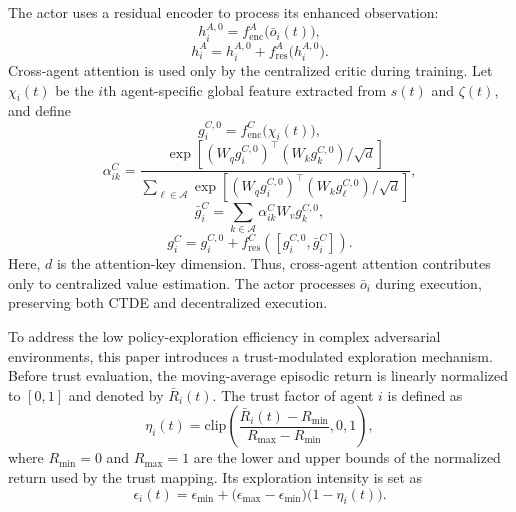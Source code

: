 \documentclass{cja}
\begin{document}
The actor uses a residual encoder to process its enhanced observation:
\begin{equation}
h_i^{A,0}=f_{\mathrm{enc}}^{A}\bigl(\bar o_i(t)\bigr),
\end{equation}
\begin{equation}
h_i^{A}
=
h_i^{A,0}+f_{\mathrm{res}}^{A}\bigl(h_i^{A,0}\bigr).
\end{equation}
Cross-agent attention is used only by the centralized critic during training. Let $\chi_i(t)$ be the $i$th agent-specific global feature extracted from $s(t)$ and $\zeta(t)$, and define
\begin{equation}
g_i^{C,0}=f_{\mathrm{enc}}^{C}\bigl(\chi_i(t)\bigr),
\end{equation}
\begin{equation}
\alpha_{ik}^{C}
=
\frac{
\exp\left[(W_qg_i^{C,0})^{\top}(W_kg_k^{C,0})/\sqrt d\right]
}{
\sum_{\ell\in\mathcal A}
\exp\left[(W_qg_i^{C,0})^{\top}(W_kg_\ell^{C,0})/\sqrt d\right]
},
\end{equation}
\begin{equation}
\bar g_i^{C}
=
\sum_{k\in\mathcal A}\alpha_{ik}^{C}W_vg_k^{C,0},
\end{equation}
\begin{equation}
g_i^{C}
=
g_i^{C,0}
+f_{\mathrm{res}}^{C}\!\left([g_i^{C,0},\bar g_i^{C}]\right).
\end{equation}
Here, $d$ is the attention-key dimension. Thus, cross-agent attention contributes only to centralized value estimation. The actor processes $\bar o_i$ during execution, preserving both CTDE and decentralized execution.

To address the low policy-exploration efficiency in complex adversarial environments, this paper introduces a trust-modulated exploration mechanism. Before trust evaluation, the moving-average episodic return is linearly normalized to $[0,1]$ and denoted by $\bar R_i(t)$. The trust factor of agent $i$ is defined as
\begin{equation}
\eta_i(t)
=
\mathrm{clip}
\left(
\frac{\bar R_i(t)-R_{\min}}{R_{\max}-R_{\min}},
0,1
\right),
\end{equation}
where $R_{\min}=0$ and $R_{\max}=1$ are the lower and upper bounds of the normalized return used by the trust mapping. Its exploration intensity is set as
\begin{equation}
\epsilon_i(t)
=
\epsilon_{\min}
+
\bigl(\epsilon_{\max}-\epsilon_{\min}\bigr)
\bigl(1-\eta_i(t)\bigr).
\end{equation}
\end{document}
